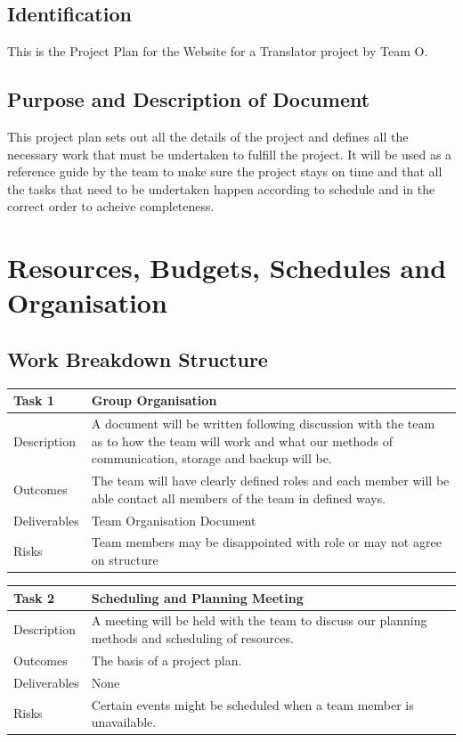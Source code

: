 \documentclass{l3proj}
\begin{document}
\subsection{Identification}
This is the Project Plan for the Website for a Translator project by Team O.

\subsection{Purpose and Description of Document}
This project plan sets out all the details of the project and defines all the necessary work that must be undertaken to 
fulfill the project. It will be used as a reference guide by the team to make sure the project stays on time and that all the tasks 
that need to be undertaken happen according to schedule and in the correct order to acheive completeness.

\section{Resources, Budgets, Schedules and Organisation}
\label{sect:rbso}
\subsection{Work Breakdown Structure} 

\begin{center}
    \begin{tabular}{ | l | p{12cm} |}
    \hline	
    Task 1 & Group Organisation \\ \hline
    Description & A document will be written following discussion with the team as to how the
	team will work and what our methods of communication, storage and backup will be. \\ \hline   
    Outcomes & The team will have clearly defined roles and each member will be able contact all members of the team in defined ways. \\ \hline
    Deliverables & Team Organisation Document \\ \hline
    Risks & Team members may be disappointed with role or may not agree on structure \\ 
    \hline
    \end{tabular}
\end{center}

\begin{center}
    \begin{tabular}{ | l | p{12cm} |}
    \hline	
    Task 2 & Scheduling and Planning Meeting \\ \hline
    Description & A meeting will be held with the team to discuss our planning methods and scheduling of resources. \\ \hline   
    Outcomes & The basis of a project plan. \\ \hline
    Deliverables & None \\ \hline
    Risks & Certain events might be scheduled when a team member is unavailable. \\ 
    \hline
    \end{tabular}
\end{center}
\end{document}
